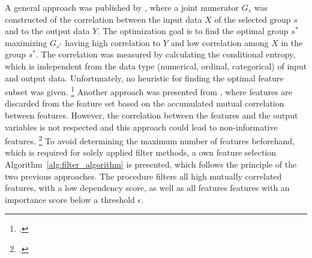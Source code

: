 A general approach was published by \cite{hall_feature_1997},
where a joint numerator $G_s$ was constructed of the correlation between the input data $X$ of the selected group $s$ and to the output data $Y$.
The optimization goal is to find the optimal group $s^*$ maximizing $G_{s^*}$ having high correlation to $Y$ and low
correlation among $X$ in the group $s^*$. The correlation was measured by calculating the conditional entropy, which is independent
from the data type (numerical, ordinal, categorical) of input and output data. Unfortunately, no heuristic for finding the optimal
feature subset was given. \footcite[cf.][p.856]{hall_feature_1997} Another approach was presented from \cite{haindl_feature_2006},
where features are discarded from the feature set based on the accumulated mutual correlation between features. However, the correlation between
the features and the output variables is not respected and this approach could lead to non-informative features. \footcite[cf.][]{haindl_feature_2006}
To avoid determining the maximum number of features beforehand, which is required for solely applied filter methods,
a own feature selection Algorithm~\ref{alg:filter_algorithm} is presented, which follows the principle of the two previous approaches.
The procedure filters all  high mutually correlated features, with a low dependency score, as well as all features features with an
importance score below a threshold $\epsilon$.




